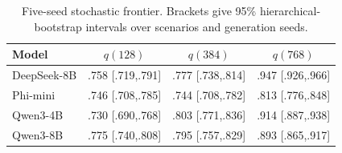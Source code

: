 \begin{table}[H]
\centering
\caption{Five-seed stochastic frontier. Brackets give 95\% hierarchical-bootstrap intervals over scenarios and generation seeds.}
\label{tab:stochasticfrontier}
\scriptsize
\setlength{\tabcolsep}{3pt}
\begin{tabular}{lccc}
\toprule
Model & $q(128)$ & $q(384)$ & $q(768)$ \\
\midrule
DeepSeek-8B & .758 [.719,.791] & .777 [.738,.814] & .947 [.926,.966] \\
Phi-mini & .746 [.708,.785] & .744 [.708,.782] & .813 [.776,.848] \\
Qwen3-4B & .730 [.690,.768] & .803 [.771,.836] & .914 [.887,.938] \\
Qwen3-8B & .775 [.740,.808] & .795 [.757,.829] & .893 [.865,.917] \\
\bottomrule
\end{tabular}
\end{table}
